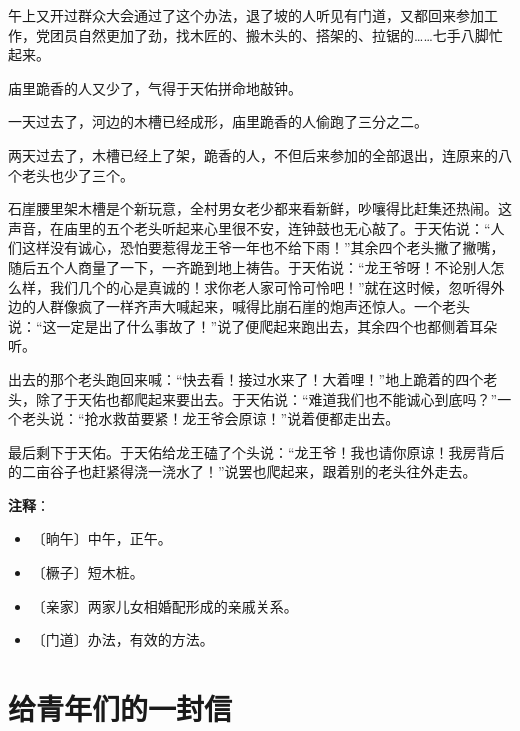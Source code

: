 \documentclass[12pt,UTF-8,openany]{ctexbook}
\begin{document}
\begin{normalsize}
    午上又开过群众大会通过了这个办法，退了坡的人听见有门道，又都回来参加工作，党团员自然更加了劲，找木匠的、搬木头的、搭架的、拉锯的……七手八脚忙起来。
    
    庙里跪香的人又少了，气得于天佑拼命地敲钟。
    
    一天过去了，河边的木槽已经成形，庙里跪香的人偷跑了三分之二。
    
    两天过去了，木槽已经上了架，跪香的人，不但后来参加的全部退出，连原来的八个老头也少了三个。
    
    石崖腰里架木槽是个新玩意，全村男女老少都来看新鲜，吵嚷得比赶集还热闹。这声音，在庙里的五个老头听起来心里很不安，连钟鼓也无心敲了。于天佑说：“人们这样没有诚心，恐怕要惹得龙王爷一年也不给下雨！”其余四个老头撇了撇嘴，随后五个人商量了一下，一齐跪到地上祷告。于天佑说：“龙王爷呀！不论别人怎么样，我们几个的心是真诚的！求你老人家可怜可怜吧！”就在这时候，忽听得外边的人群像疯了一样齐声大喊起来，喊得比崩石崖的炮声还惊人。一个老头说：“这一定是出了什么事故了！”说了便爬起来跑出去，其余四个也都侧着耳朵听。
    
    出去的那个老头跑回来喊：“快去看！接过水来了！大着哩！”地上跪着的四个老头，除了于天佑也都爬起来要出去。于天佑说：“难道我们也不能诚心到底吗？”一个老头说：“抢水救苗要紧！龙王爷会原谅！”说着便都走出去。
    
    最后剩下于天佑。于天佑给龙王磕了个头说：“龙王爷！我也请你原谅！我房背后的二亩谷子也赶紧得浇一浇水了！”说罢也爬起来，跟着别的老头往外走去。
    
\end{normalsize}


\newpage

\textbf{注释}：

\vspace{-1em}

\begin{itemize}
    \setlength\itemsep{-0.2em}
    \item 〔晌午〕中午，正午。
    \item 〔橛子〕短木桩。
    \item 〔亲家〕两家儿女相婚配形成的亲戚关系。
    \item 〔门道〕办法，有效的方法。
\end{itemize}

\chapter{给青年们的一封信}
\end{document}
